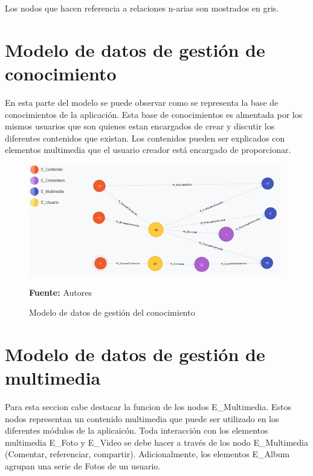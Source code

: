 Los nodos que hacen referencia a relaciones n-arias son mostrados en gris.

\section{Modelo de datos de gestión de conocimiento}

En esta parte del modelo se puede observar como se representa la base de conocimientos de la aplicación. Esta base de conocimientos es almentada por los mismos usuarios que son quienes estan encargados de crear y discutir los diferentes contenidos que existan. Los contenidos pueden ser explicados con elementos multimedia que el usuario creador está encargado de proporcionar.

\begin{figure}[!htb]
  \begin{center}
    \includegraphics[width=11cm]{./imagenes/Modelo_de_datos/Contenidos.png}
    \caption{Modelo de datos de gestión del conocimiento}
    \label{fig:modelo_datos_gestion_conocimiento}
    \textbf{Fuente:}  Autores \\
  \end{center}
\end{figure}

\section{Modelo de datos de gestión de multimedia}

Para esta seccion cabe destacar la funcion de los nodos E\_Multimedia. Estos nodos representan un contenido multimedia que puede ser utilizado en los diferentes módulos de la aplicaicón. Toda interacción con los elementos multimedia E\_Foto y E\_Video se debe hacer a través de los nodo E\_Multimedia (Comentar, referenciar, compartir). Adicionalmente, los elementos E\_Album agrupan una serie de Fotos de un usuario.

